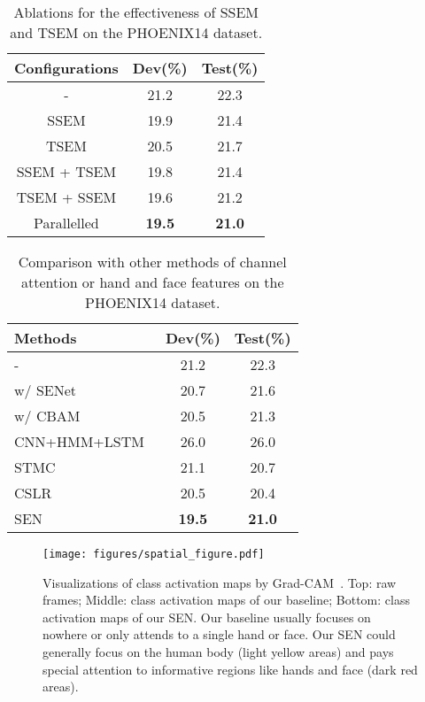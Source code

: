 \documentclass[letterpaper]{article} \usepackage{aaai23}  \usepackage{times}  \usepackage{helvet}  \usepackage{courier}  \usepackage[hyphens]{url}  \usepackage{graphicx} \urlstyle{rm} \def\UrlFont{\rm}  \usepackage{natbib}  \usepackage{caption} \frenchspacing  \setlength{\pdfpagewidth}{8.5in} \setlength{\pdfpageheight}{11in} \usepackage{algorithm}
\begin{document}
\begin{table}[t]   
  \centering
  \begin{tabular}{ccc}
  \hline
  Configurations & Dev(\%) & Test(\%)\\
  \hline
  - & 21.2 & 22.3\\
  SSEM  & 19.9  & 21.4\\
  TSEM & 20.5 & 21.7 \\
  SSEM + TSEM & 19.8  & 21.4 \\
  TSEM + SSEM & 19.6  & 21.2 \\
  Parallelled & \textbf{19.5}  & \textbf{21.0} \\
  \hline
  \end{tabular}
  \caption{Ablations for the effectiveness of SSEM and TSEM on the PHOENIX14 dataset.} 
  \label{tab5} 
  \end{table}

\begin{table}[t]   
  \centering
  \setlength\tabcolsep{3pt}
  \begin{tabular}{lcc}
  \hline
  Methods & Dev(\%) & Test(\%)\\
  \hline
  - & 21.2 & 22.3\\
  w/ SENet~\cite{hu2018squeeze}  & 20.7  & 21.6 \\
  w/ CBAM~\cite{woo2018cbam} & 20.5 & 21.3 \\
  \hline
  CNN+HMM+LSTM~\cite{koller2019weakly} & 26.0  & 26.0 \\
  STMC~\cite{zhou2020spatial} & 21.1  & 20.7 \\
  CSLR~\cite{zuo2022c2slr} & 20.5  & 20.4 \\
  \hline
  SEN & \textbf{19.5} & \textbf{21.0} \\
  \hline
  \end{tabular}
  \caption{Comparison with other methods of channel attention or hand and face features on the PHOENIX14 dataset.} 
  \label{tab6} 
  \end{table}

\begin{figure}[t]
  \centering
  \texttt{[image: figures/spatial\_figure.pdf]}
  \caption{Visualizations of class activation maps by Grad-CAM~\cite{selvaraju2017grad}. Top: raw frames; Middle: class activation maps of our baseline; Bottom: class activation maps of our SEN. Our baseline usually focuses on nowhere or only attends to a single hand or face. Our SEN could generally focus on the human body (light yellow areas) and pays special attention to informative regions like hands and face (dark red areas).}
  \label{fig5}
  \end{figure}  
\end{document}

